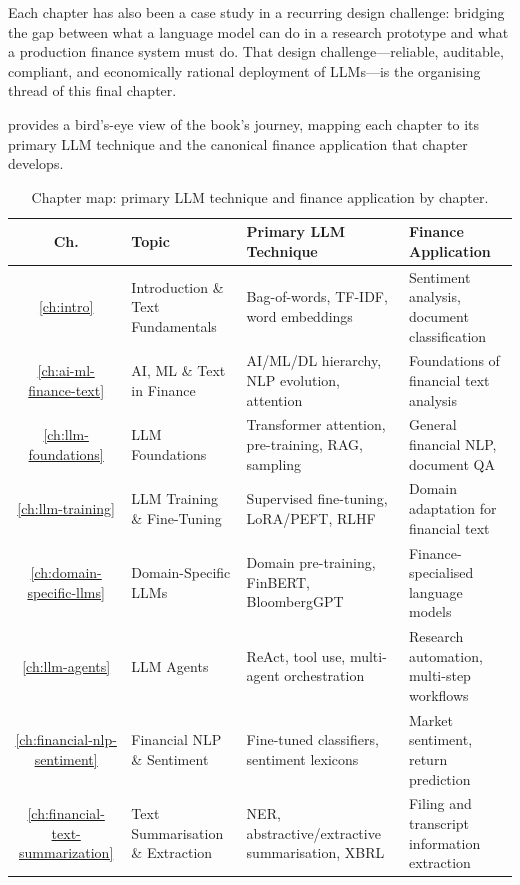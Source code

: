 \begin{context}
Each chapter has also been a case study in a recurring design challenge: bridging the gap between what a language model can do in a research prototype and what a production finance system must do. That design challenge---reliable, auditable, compliant, and economically rational deployment of LLMs---is the organising thread of this final chapter.

 provides a bird's-eye view of the book's journey, mapping each chapter to its primary LLM technique and the canonical finance application that chapter develops.

\end{context}

\begin{table}[htbp]
\caption{Chapter map: primary LLM technique and finance application by chapter.}
\label{tab:chapter-map}
\centering
\small
\setlength{\tabcolsep}{5pt}
\begin{tabularx}{\linewidth}{c l X X}
\toprule
\textbf{Ch.} & \textbf{Topic} & \textbf{Primary LLM Technique} & \textbf{Finance Application} \\
\midrule
\ref{ch:intro} & Introduction \& Text Fundamentals
  & Bag-of-words, TF-IDF, word embeddings
  & Sentiment analysis, document classification \\[3pt]
\ref{ch:ai-ml-finance-text} & AI, ML \& Text in Finance
  & AI/ML/DL hierarchy, NLP evolution, attention
  & Foundations of financial text analysis \\[3pt]
\ref{ch:llm-foundations} & LLM Foundations
  & Transformer attention, pre-training, RAG, sampling
  & General financial NLP, document QA \\[3pt]
\ref{ch:llm-training} & LLM Training \& Fine-Tuning
  & Supervised fine-tuning, LoRA/PEFT, RLHF
  & Domain adaptation for financial text \\[3pt]
\ref{ch:domain-specific-llms} & Domain-Specific LLMs
  & Domain pre-training, FinBERT, BloombergGPT
  & Finance-specialised language models \\[3pt]
\ref{ch:llm-agents} & LLM Agents
  & ReAct, tool use, multi-agent orchestration
  & Research automation, multi-step workflows \\[3pt]
\ref{ch:financial-nlp-sentiment} & Financial NLP \& Sentiment
  & Fine-tuned classifiers, sentiment lexicons
  & Market sentiment, return prediction \\[3pt]
\ref{ch:financial-text-summarization} & Text Summarisation \& Extraction
  & NER, abstractive/extractive summarisation, XBRL
  & Filing and transcript information extraction \\[3pt]

\end{tabularx}
\end{table}
